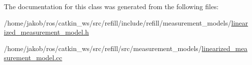 The documentation for this class was generated from the following files\+:\begin{DoxyCompactItemize}
\item 
/home/jakob/ros/catkin\+\_\+ws/src/refill/include/refill/measurement\+\_\+models/\hyperlink{linearized__measurement__model_8h}{linearized\+\_\+measurement\+\_\+model.\+h}\item 
/home/jakob/ros/catkin\+\_\+ws/src/refill/src/measurement\+\_\+models/\hyperlink{linearized__measurement__model_8cc}{linearized\+\_\+measurement\+\_\+model.\+cc}\end{DoxyCompactItemize}

